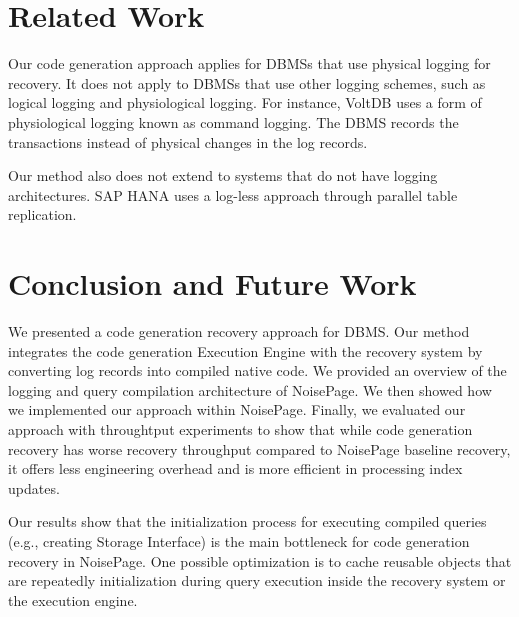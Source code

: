 \documentclass[12pt]{cmuthesis}
\begin{document}
\chapter{Related Work}
Our code generation approach applies for DBMSs that use physical logging for recovery. It does not apply to DBMSs that use other logging schemes, such as logical logging and physiological logging. For instance, VoltDB\cite{malviya14} uses a form of physiological logging known as command logging. The DBMS records the transactions instead of physical changes in the log records. 

Our method also does not extend to systems that do not have logging architectures. SAP HANA\cite{lee18} uses a log-less approach through parallel table replication.

\chapter{Conclusion and Future Work}
We presented a code generation recovery approach for DBMS. Our method integrates the code generation Execution Engine with the recovery system by converting log records into compiled native code. We provided an overview of the logging and query compilation architecture of NoisePage. We then showed how we implemented our approach within NoisePage. Finally, we evaluated our approach with throughtput experiments to show that while code generation recovery has worse recovery throughput compared to NoisePage baseline recovery, it offers less engineering overhead and is more efficient in processing index updates.

Our results show that the initialization process for executing compiled queries (e.g., creating Storage Interface) is the main bottleneck for code generation recovery in NoisePage. One possible optimization is to cache reusable objects that are repeatedly initialization during query execution inside the recovery system or the execution engine.

%

\backmatter


\renewcommand{\bibsection}{\chapter{\bibname}}

\end{document}
